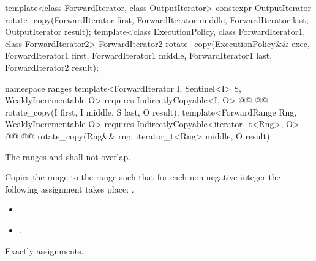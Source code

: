 %
\begin{itemdecl}
template<class ForwardIterator, class OutputIterator>
  constexpr OutputIterator
    rotate_copy(ForwardIterator first, ForwardIterator middle, ForwardIterator last,
                OutputIterator result);
template<class ExecutionPolicy, class ForwardIterator1, class ForwardIterator2>
  ForwardIterator2
    rotate_copy(ExecutionPolicy&& exec,
                ForwardIterator1 first, ForwardIterator1 middle, ForwardIterator1 last,
                ForwardIterator2 result);
\end{itemdecl}
\begin{addedblock}
\begin{itemdecl}
namespace ranges {
  template<ForwardIterator I, Sentinel<I> S, WeaklyIncrementable O>
    requires IndirectlyCopyable<I, O>
    @@
    @@
      rotate_copy(I first, I middle, S last, O result);
  template<ForwardRange Rng, WeaklyIncrementable O>
    requires IndirectlyCopyable<iterator_t<Rng>, O>
    @@
    @@
      rotate_copy(Rng&& rng, iterator_t<Rng> middle, O result);
}
\end{itemdecl}
\end{addedblock}

\begin{itemdescr}
\pnum
\requires
The ranges
and
shall not overlap.

\pnum
\effects
Copies the range
to the range
such that for each non-negative integer
the following assignment takes place:
.

\pnum
\returns
\begin{itemize}
\item {} 
\item {}.
\end{itemize}

\pnum
\complexity
Exactly
assignments.
\end{itemdescr}


